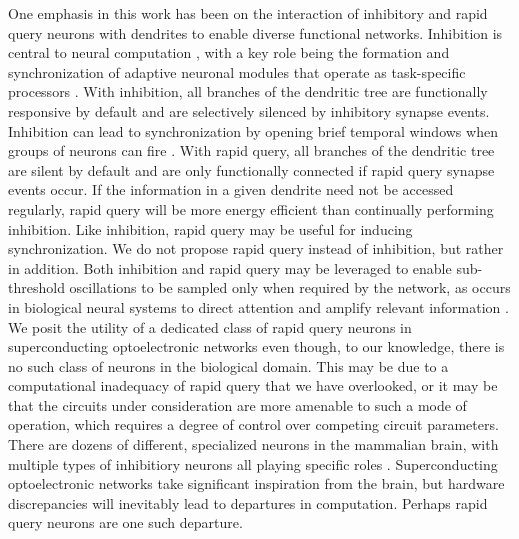 \documentclass[twocolumn]{article}
\begin{document}
One emphasis in this work has been on the interaction of inhibitory and rapid query neurons with dendrites to enable diverse functional networks. Inhibition is central to neural computation \cite{robu2015}, with a key role being the formation and synchronization of adaptive neuronal modules that operate as task-specific processors \cite{vala2001,sase2001}. With inhibition, all branches of the dendritic tree are functionally responsive by default and are selectively silenced by inhibitory synapse events. Inhibition can lead to synchronization by opening brief temporal windows when groups of neurons can fire \cite{bu2006}. With rapid query, all branches of the dendritic tree are silent by default and are only functionally connected if rapid query synapse events occur. If the information in a given dendrite need not be accessed regularly, rapid query will be more energy efficient than continually performing inhibition. Like inhibition, rapid query may be useful for inducing synchronization. We do not propose rapid query instead of inhibition, but rather in addition. Both inhibition and rapid query may be leveraged to enable sub-threshold oscillations to be sampled only when required by the network, as occurs in biological neural systems to direct attention and amplify relevant information \cite{enfr2001}. We posit the utility of a dedicated class of rapid query neurons in superconducting optoelectronic networks even though, to our knowledge, there is no such class of neurons in the biological domain. This may be due to a computational inadequacy of rapid query that we have overlooked, or it may be that the circuits under consideration are more amenable to such a mode of operation, which requires a degree of control over competing circuit parameters. There are dozens of different, specialized neurons in the mammalian brain, with multiple types of inhibitiory neurons all playing specific roles \cite{robu2015,bu2006}. Superconducting optoelectronic networks take significant inspiration from the brain, but hardware discrepancies will inevitably lead to departures in computation. Perhaps rapid query neurons are one such departure.
\end{document}
